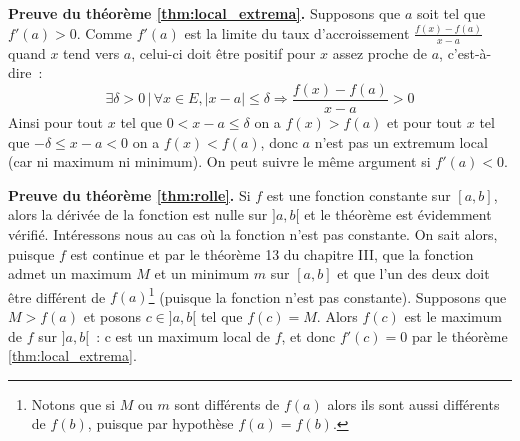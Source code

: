 \documentclass[10pt,notheorems]{beamer}
\theoremstyle{plain}
\theoremstyle{definition} %
\begin{document}
\begin{notes}

  \textbf{Preuve du théorème \hyperlink{slide_extrema_2}{\ref{thm:local_extrema}}.} Supposons que $a$ soit tel que $f'(a)>0$. Comme $f'(a)$ est la limite du taux d'accroissement $\frac{f(x)-f(a)}{x-a}$ quand $x$ tend vers $a$, celui-ci doit être positif pour $x$ assez proche de $a$, c'est-à-dire~:
  \[
    \exists \delta>0\,|\,\forall x\in E, |x-a|\leq\delta \Rightarrow \frac{f(x)-f(a)}{x-a}>0
  \]
  Ainsi pour tout $x$ tel que $0<x-a\leq\delta$ on a $f(x)>f(a)$ et pour tout $x$ tel que $-\delta\leq x-a <0$ on a $f(x)<f(a)$, donc $a$ n'est pas un extremum local (car ni maximum ni minimum). On peut suivre le même argument si $f'(a)<0$.\newline

  \textbf{Preuve du théorème \hyperlink{slide_extrema_2}{\ref{thm:rolle}}.} Si $f$ est une fonction constante sur $[a,b]$, alors la dérivée de la fonction est nulle sur $]a,b[$ et le théorème est évidemment vérifié. Intéressons nous au cas où la fonction n'est pas constante. On sait alors, puisque $f$ est continue et par le théorème 13 du chapitre III, que la fonction admet un maximum $M$ et un minimum $m$ sur $[a,b]$ et que l'un des deux doit être différent de $f(a)$\footnote{Notons que si $M$ ou $m$ sont différents de $f(a)$ alors ils sont aussi différents de $f(b)$, puisque par hypothèse $f(a)=f(b)$.} (puisque la fonction n'est pas constante). Supposons que $M>f(a)$ et posons $c\in ]a,b[$ tel que $f(c)=M$. Alors $f(c)$ est le maximum de $f$ sur $]a, b[$~: c est un maximum local de $f$, et donc $f'(c) = 0$ par le théorème \hyperlink{slide_extrema_2}{\ref{thm:local_extrema}}.
\end{notes}
\end{document}
